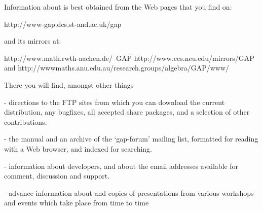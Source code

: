 





Information about {\GAP} is best obtained from the {\GAP} Web pages that
you find on:

\begintt
http://www-gap.dcs.st-and.ac.uk/gap
\endtt

and its mirrors at:

\begintt
http://www.math.rwth-aachen.de/~GAP
http://www.ccs.neu.edu/mirrors/GAP and
http://wwwmaths.anu.edu.au/research.groups/algebra/GAP/www/
\endtt

There you will find, amongst other things
\beginlist
\item{-} directions to the FTP sites from which you can download the
current {\GAP} distribution, any bugfixes, all accepted share packages,
and a selection of other contributions.
\item{-} the {\GAP} manual and an archive of the `gap-forum' mailing
list, formatted for reading with a Web browser, and indexed for
searching.
\item{-} information about {\GAP} developers, and about the email
addresses available for comment, discussion and support.
\item{-} advance information about and copies of presentations from
various {\GAP} workshops and events which take place from time to time
\endlist

